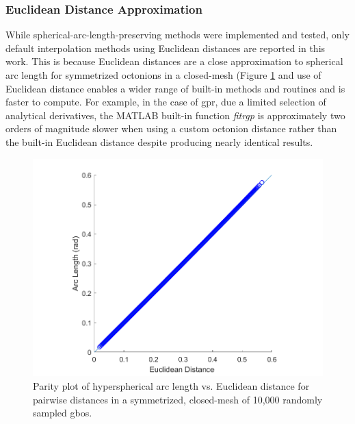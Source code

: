 \documentclass[preprint,12pt]{elsarticle}
\begin{document}
\subsubsection{Euclidean Distance Approximation}
While spherical-arc-length-preserving methods were implemented and tested, only default interpolation methods using Euclidean distances are reported in this work. This is because Euclidean distances are a close approximation to spherical arc length for symmetrized octonions in a closed-mesh (Figure \ref{fig:dist-parity} and use of Euclidean distance enables a wider range of built-in methods and routines and is faster to compute. For example, in the case of \gls{gpr}, due a limited selection of analytical derivatives, the MATLAB built-in function \textit{fitrgp} is approximately two orders of magnitude slower when using a custom octonion distance rather than the built-in Euclidean distance despite producing nearly identical results.

\begin{figure}
\centering
\includegraphics{dist-parity.png}
\caption{Parity plot of hyperspherical arc length vs. Euclidean distance for pairwise distances in a symmetrized, closed-mesh of 10,000 randomly sampled \glspl{gbo}.}
\label{fig:dist-parity}
\end{figure}
\end{document}
